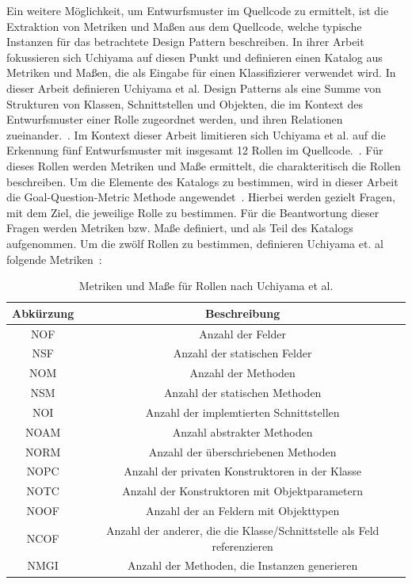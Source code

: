 \pagebreak

Ein weitere Möglichkeit, um Entwurfsmuster im Quellcode zu ermittelt, ist die Extraktion von Metriken und Maßen aus dem Quellcode, welche typische Instanzen für das betrachtete Design Pattern beschreiben.
In ihrer Arbeit fokussieren sich Uchiyama auf diesen Punkt und definieren einen Katalog aus Metriken und Maßen, die als Eingabe für einen Klassifizierer verwendet wird.
In dieser Arbeit definieren Uchiyama et al. Design Patterns als eine Summe von Strukturen von Klassen, Schnittstellen und Objekten, die im Kontext des Entwurfsmuster einer Rolle zugeordnet werden, und ihren Relationen zueinander.~\cite[S. 3]{Uchiyama2014}.
Im Kontext dieser Arbeit limitieren sich Uchiyama et al. auf die Erkennung fünf Entwurfsmuster mit insgesamt 12 Rollen im Quellcode.~\cite[S. 4]{Uchiyama2014}.
Für dieses Rollen werden Metriken und Maße ermittelt, die charakteritisch die Rollen beschreiben.
Um die Elemente des Katalogs zu bestimmen, wird in dieser Arbeit die Goal-Question-Metric Methode angewendet~\cite[S. 4]{Uchiyama2014}.
Hierbei werden gezielt Fragen, mit dem Ziel, die jeweilige Rolle zu bestimmen. Für die Beantwortung dieser Fragen werden Metriken bzw. Maße definiert, und als Teil des Katalogs aufgenommen.
Um die zwölf Rollen zu bestimmen, definieren Uchiyama et. al folgende Metriken~\cite[S. 7]{Uchiyama2014}:


\begin{table}[H]
    \centering
    \begin{tabular}{|c|c|}
        \hline
        Abkürzung & Beschreibung\\
        \hline
        NOF & Anzahl der Felder\\
        NSF & Anzahl der statischen Felder\\
        NOM & Anzahl der Methoden\\
        NSM & Anzahl der statischen Methoden\\
        NOI & Anzahl der implemtierten Schnittstellen\\
        NOAM & Anzahl abstrakter Methoden\\
        NORM & Anzahl der überschriebenen Methoden\\
        NOPC & Anzahl der privaten Konstruktoren in der Klasse\\
        NOTC & Anzahl der Konstruktoren mit Objektparametern\\
        NOOF & Anzahl der an Feldern mit Objekttypen\\
        NCOF & Anzahl der anderer, die die Klasse/Schnittstelle als Feld referenzieren\\
        NMGI & Anzahl der Methoden, die Instanzen generieren\\
        \hline 
    \end{tabular}
    \caption{Metriken und Maße für Rollen nach Uchiyama et al.}
    \label{table:metrics}
\end{table}

